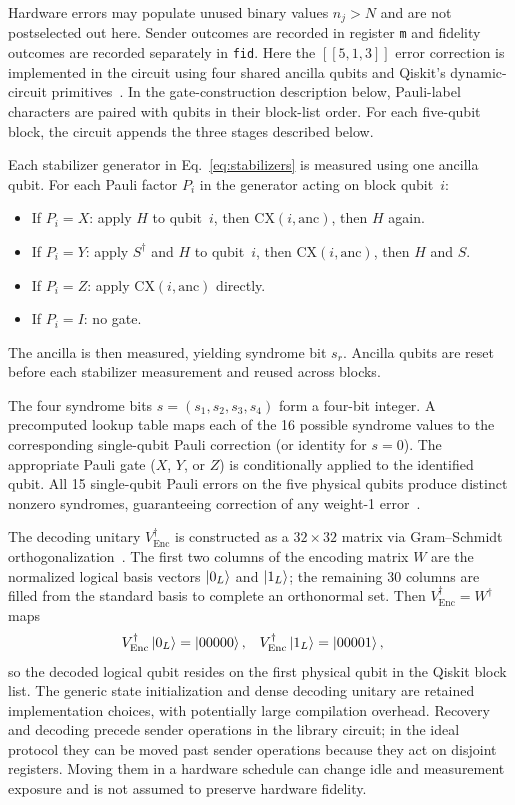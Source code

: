 \documentclass[aps,physrev,10pt,twocolumn,superscriptaddress,floatfix]{revtex4-2}
\DeclareMathOperator{\Enc}{Enc}
\begin{document}
Hardware errors may populate unused binary values $n_j>N$ and are not postselected out here. Sender outcomes are recorded in register \texttt{m} and fidelity outcomes are recorded separately in \texttt{fid}. Here the $[[5,1,3]]$ error correction is implemented in the circuit using four shared ancilla qubits and Qiskit's dynamic-circuit primitives~\cite{wang2021implementation}. In the gate-construction description below, Pauli-label characters are paired with qubits in their block-list order. For each five-qubit block, the circuit appends the three stages described below.

Each stabilizer generator in Eq.~\eqref{eq:stabilizers} is measured using one ancilla qubit. For each Pauli factor $P_i$ in the generator acting on block qubit~$i$:
\begin{itemize}
\item If $P_i = X$: apply $H$ to qubit~$i$, then $\mathrm{CX}(i,\mathrm{anc})$, then $H$ again.
\item If $P_i = Y$: apply $S^\dagger$ and $H$ to qubit~$i$, then $\mathrm{CX}(i,\mathrm{anc})$, then $H$ and $S$.
\item If $P_i = Z$: apply $\mathrm{CX}(i,\mathrm{anc})$ directly.
\item If $P_i = I$: no gate.
\end{itemize}
The ancilla is then measured, yielding syndrome bit $s_r$. Ancilla qubits are reset before each stabilizer measurement and reused across blocks.

The four syndrome bits $s = (s_1, s_2, s_3, s_4)$ form a four-bit integer. A precomputed lookup table maps each of the 16 possible syndrome values to the corresponding single-qubit Pauli correction (or identity for $s=0$). The appropriate Pauli gate ($X$, $Y$, or $Z$) is conditionally applied to the identified qubit. All 15 single-qubit Pauli errors on the five physical qubits produce distinct nonzero syndromes, guaranteeing correction of any weight-1 error~\cite{laflamme1996perfect,gottesman1997stabilizer}.

The decoding unitary $V_{\Enc}^\dagger$ is constructed as a $32\times 32$ matrix via Gram--Schmidt orthogonalization~\cite{nielsen2010quantum}. The first two columns of the encoding matrix $W$ are the normalized logical basis vectors $\ket{0_L}$ and $\ket{1_L}$; the remaining 30 columns are filled from the standard basis to complete an orthonormal set. Then $V_{\Enc}^\dagger = W^\dagger$ maps
\begin{align}
V_{\Enc}^\dagger \ket{0_L} &= \ket{00000}, &
V_{\Enc}^\dagger \ket{1_L} &= \ket{00001},
\end{align}
so the decoded logical qubit resides on the first physical qubit in the Qiskit block list. The generic state initialization and dense decoding unitary are retained implementation choices, with potentially large compilation overhead. Recovery and decoding precede sender operations in the library circuit; in the ideal protocol they can be moved past sender operations because they act on disjoint registers. Moving them in a hardware schedule can change idle and measurement exposure and is not assumed to preserve hardware fidelity.
\end{document}
